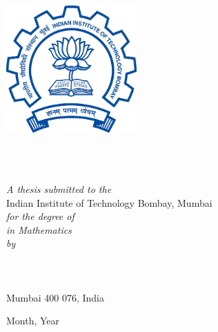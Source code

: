 \documentclass[11pt,english,
onehalfspacing,
headsepline]{thesis}
\author{Write Your Name} %
\numberwithin{equation}{subsection}
\theoremstyle{definition}
\begin{document}
\frontmatter %

\pagestyle{plain} 

\begin{titlepage}
\begin{center}

\vspace*{.03\textheight}
\includegraphics[width=50mm]{IITB-logo.jpg} %

\HRule \\[0.4cm] %
{\huge \bfseries \ttitle\par}\vspace{0.4cm} %
\HRule \\[1.5cm] %

\large \textit{A thesis submitted to the} \\ 
Indian Institute of Technology Bombay, Mumbai\\
\textit{for the degree of \degreename \\ in Mathematics \\ by}\\ [1.0cm] 

\Large \authorname \\ 
\large \deptname \\ \large \univname \\ Mumbai 400 076, India

 
\vfill

{\large Month, Year}\\[1cm] %

\end{center}

\end{titlepage}

\end{document}
